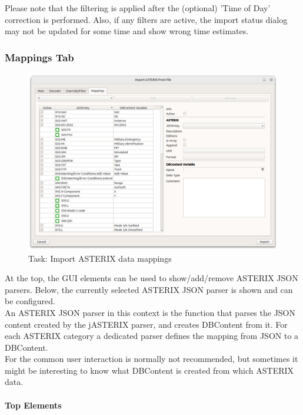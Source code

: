 Please note that the filtering is applied after the (optional) 'Time of Day' correction is performed. Also, if any filters are active, the import status dialog may not be updated for some time and show wrong time estimates.

\subsubsection{Mappings Tab}

\begin{figure}[H]
  \center
    \hspace*{-0.5cm}
    \includegraphics[width=17cm]{figures/asterix_import_data_mappings.png}
  \caption{Task: Import ASTERIX data mappings}
\end{figure}

At the top, the GUI elements can be used to show/add/remove ASTERIX JSON parsers. Below, the currently selected ASTERIX JSON parser is shown and can be configured. \\

An ASTERIX JSON parser in this context is the function that parses the JSON content created by the jASTERIX parser, and creates DBContent from it. 
For each ASTERIX category a dedicated parser defines the mapping from JSON to a DBContent. \\

For the common user interaction is normally not recommended, but sometimes it might be interesting to know what DBContent is created from which ASTERIX data.

\paragraph{Top Elements}

